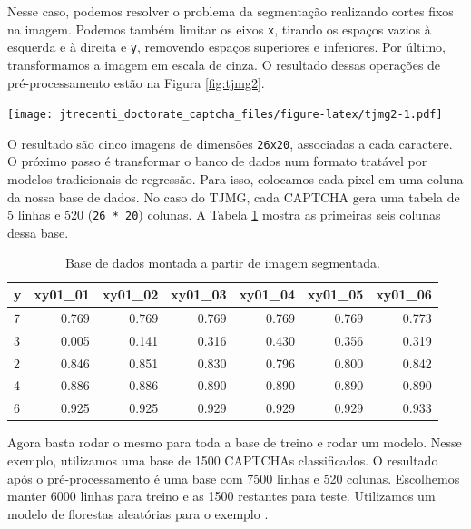 \documentclass[12pt,]{report}
\let\origfigure\figure
\let\endorigfigure\endfigure
\renewenvironment{figure}[1][2] {
    \expandafter\origfigure\expandafter[H]
} {
    \endorigfigure
}
\begin{document}
Nesse caso, podemos resolver o problema da segmentação realizando cortes
fixos na imagem. Podemos também limitar os eixos \texttt{x}, tirando os
espaços vazios à esquerda e à direita e \texttt{y}, removendo espaços
superiores e inferiores. Por último, transformamos a imagem em escala de
cinza. O resultado dessas operações de pré-processamento estão na Figura
\ref{fig:tjmg2}.

\begin{figure}
\centering
\texttt{[image: jtrecenti\_doctorate\_captcha\_files/figure-latex/tjmg2-1.pdf]}
\caption{\label{fig:tjmg2}CAPTCHA do TJMG após segmentação.}
\end{figure}

O resultado são cinco imagens de dimensões \texttt{26x20}, associadas a
cada caractere. O próximo passo é transformar o banco de dados num
formato tratável por modelos tradicionais de regressão. Para isso,
colocamos cada pixel em uma coluna da nossa base de dados. No caso do
TJMG, cada CAPTCHA gera uma tabela de 5 linhas e 520
(\texttt{26\ *\ 20}) colunas. A Tabela \ref{tab:imgsep} mostra as
primeiras seis colunas dessa base.

\begin{table}

\caption{\label{tab:imgsep}Base de dados montada a partir de imagem segmentada.}
\centering
\begin{tabular}[t]{l|r|r|r|r|r|r}
\hline
y & xy01\_01 & xy01\_02 & xy01\_03 & xy01\_04 & xy01\_05 & xy01\_06\\
\hline
7 & 0.769 & 0.769 & 0.769 & 0.769 & 0.769 & 0.773\\
\hline
3 & 0.005 & 0.141 & 0.316 & 0.430 & 0.356 & 0.319\\
\hline
2 & 0.846 & 0.851 & 0.830 & 0.796 & 0.800 & 0.842\\
\hline
4 & 0.886 & 0.886 & 0.890 & 0.890 & 0.890 & 0.890\\
\hline
6 & 0.925 & 0.925 & 0.929 & 0.929 & 0.929 & 0.933\\
\hline
\end{tabular}
\end{table}

Agora basta rodar o mesmo para toda a base de treino e rodar um modelo.
Nesse exemplo, utilizamos uma base de 1500 CAPTCHAs classificados. O
resultado após o pré-processamento é uma base com 7500 linhas e 520
colunas. Escolhemos manter 6000 linhas para treino e as 1500 restantes
para teste. Utilizamos um modelo de florestas aleatórias para o exemplo
\citep{breiman2001random}.
\end{document}

